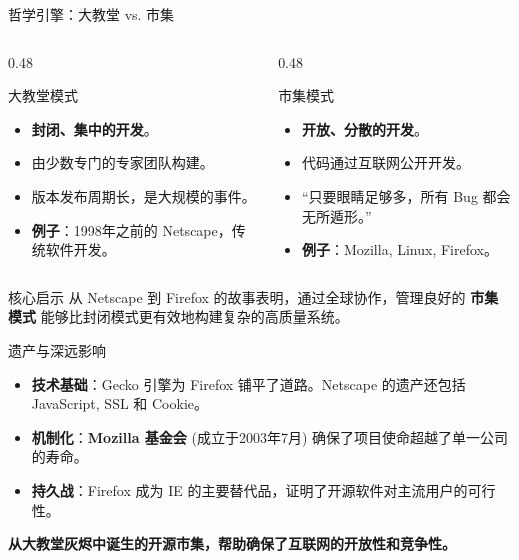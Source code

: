 \documentclass{beamer}
\begin{document}
\begin{frame}[t]{哲学引擎：大教堂 vs. 市集}
\begin{columns}
    \begin{column}{0.48\textwidth}
        \begin{block}{大教堂模式}
            \scriptsize
            \begin{itemize}
                \item \textbf{封闭、集中的开发}。
                \item 由少数专门的专家团队构建。
                \item 版本发布周期长，是大规模的事件。
                \item \textbf{例子}：1998年之前的 Netscape，传统软件开发。
            \end{itemize}
        \end{block}
    \end{column}
    \begin{column}{0.48\textwidth}
        \begin{block}{市集模式}
            \scriptsize
            \begin{itemize}
                \item \textbf{开放、分散的开发}。
                \item 代码通过互联网公开开发。
                \item “只要眼睛足够多，所有 Bug 都会无所遁形。”
                \item \textbf{例子}：Mozilla, Linux, Firefox。
            \end{itemize}
        \end{block}
    \end{column}
\end{columns}
\vspace{1em}
\begin{exampleblock}{核心启示}
从 Netscape 到 Firefox 的故事表明，通过全球协作，管理良好的 \textbf{市集模式} 能够比封闭模式更有效地构建复杂的高质量系统。
\end{exampleblock}
\end{frame}

\begin{frame}[t]{遗产与深远影响}
\begin{itemize}
    \item \textbf{技术基础}：Gecko 引擎为 Firefox 铺平了道路。Netscape 的遗产还包括 JavaScript, SSL 和 Cookie。
    \item \textbf{机制化}：\textbf{Mozilla 基金会} (成立于2003年7月) 确保了项目使命超越了单一公司的寿命。
    \item \textbf{持久战}：Firefox 成为 IE 的主要替代品，证明了开源软件对主流用户的可行性。
\end{itemize}
\begin{center}
    \textbf{从大教堂灰烬中诞生的开源市集，帮助确保了互联网的开放性和竞争性。}
\end{center}
\end{frame}
\end{document}
